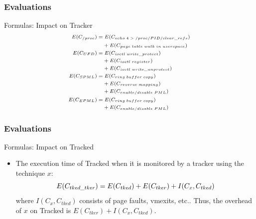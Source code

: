 \documentclass[xcolor=table,bigger,unknownkeysallowed]{beamer}
\begin{document}
        \begin{frame}
			\frametitle{Evaluations}
			\begin{block}{Formulas: Impact on Tracker}
				\begin{equation}\scriptsize
					\begin{split}
						E(C_{/proc}) = & \; E(C_{echo \; 4 \; > \; /proc/PID/clear\_refs}) \\
									& + E(C_{page \; table \; walk \; in \; userspace}) \\
						E(C_{UFD}) = & \; E(C_{ioctl \; write\_protect}) \\
									& + E(C_{ioctl \; register}) \\
									& + E(C_{ioctl \; write\_unprotect}) \\
						E(C_{SPML}) = & \; E(C_{ring \; buffer \; copy}) \\
									& + E(C_{reverse \; mapping}) \\
									& + E(C_{enable/disable \; PML}) \\
						E(C_{EPML}) = & \; E(C_{ring \; buffer \; copy}) \\
									& + E(C_{enable/disable \; PML})
					\end{split}
					\label{eq:formula-detailed}
				\end{equation}								
			\end{block}
        \end{frame}
        \begin{frame}
            \frametitle{Evaluations}			
			\begin{block}{Formulas: Impact on Tracked}
				\begin{itemize}
					\item The execution time of Tracked when it is monitored by a tracker using the technique $x$:
					\begin{equation}
						\small
						\label{eq:formula-tracked}
						E(C_{tked\_tker}) = E(C_{tked}) + E(C_{tker}) + I(C_{x},C_{tked})
					\end{equation}
					where $I(C_{x},C_{tked})$ consists of page faults, vmexits, etc..
					Thus, the overhead of $x$ on Tracked is $E(C_{tker}) + I(C_{x},C_{tked})$. 
				\end{itemize}
			\end{block} 
        \end{frame}        
\end{document}
